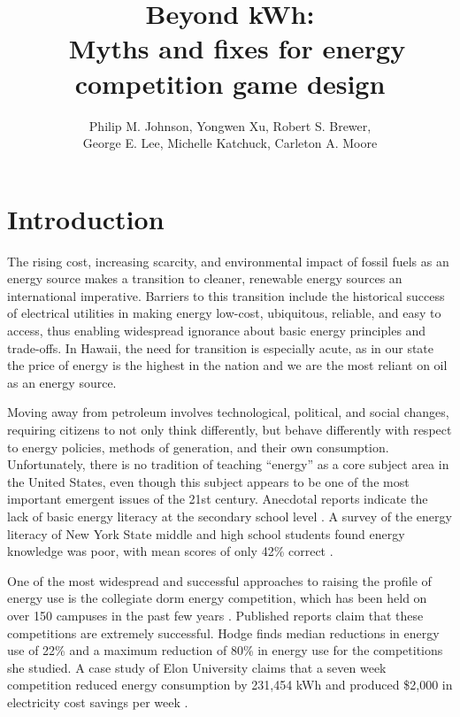 \documentclass[jou]{apa} %
\title{Beyond kWh: \\ \
       Myths and fixes for energy competition game design}
\author{Philip M. Johnson, Yongwen Xu, Robert S. Brewer, \\ 
        George E. Lee, Michelle Katchuck, Carleton A. Moore}
\affiliation{Collaborative Software Development Laboratory \\ 
             Information and Computer Sciences \\ 
             University of Hawaii \\ 
             Honolulu, HI USA \\ 
             johnson@hawaii.edu}
\begin{document}
\maketitle 

\section{Introduction}  

The rising cost, increasing scarcity, and environmental impact of fossil fuels as an
energy source makes a transition to cleaner, renewable energy sources an international
imperative. Barriers to this transition include the historical success of electrical
utilities in making energy low-cost, ubiquitous, reliable, and easy to access, thus
enabling widespread ignorance about basic energy principles and trade-offs.  In Hawaii,
the need for transition is especially acute, as in our state the price of energy is the
highest in the nation and we are the most reliant on oil as an energy source.

Moving away from petroleum involves technological, political, and social changes,
requiring citizens to not only think differently, but behave differently with respect to
energy policies, methods of generation, and their own consumption. Unfortunately, there is
no tradition of teaching ``energy'' as a core subject area in the United States, even
though this subject appears to be one of the most important emergent issues of the 21st
century. Anecdotal reports indicate the lack of basic energy literacy at the secondary
school level \cite{Ammons2010}. A survey of the energy literacy of New York State
middle and high school students found energy knowledge was poor, with mean scores of only
42\% correct \cite{DeWaters2011}.



One of the most widespread and successful approaches to raising the profile of energy use
is the collegiate dorm energy competition, which has been held on over 150 campuses in the
past few years \cite{Hodge2010}.  Published reports claim that these competitions are
extremely successful.  Hodge finds median reductions in energy use of 22\% and a maximum
reduction of 80\% in energy use for the competitions she studied. A case study of Elon
University claims that a seven week competition reduced energy consumption by 231,454 kWh
and produced \$2,000 in electricity cost savings per week \cite{Durr2010}.
\end{document}
